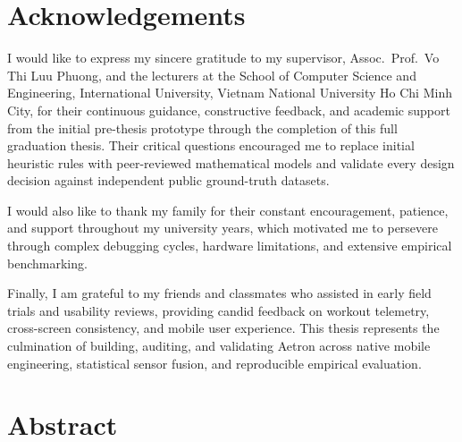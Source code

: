 \documentclass[12pt,a4paper,oneside]{report}
\begin{document}
\chapter*{Acknowledgements}
\thispagestyle{plain}

I would like to express my sincere gratitude to my supervisor, Assoc.\ Prof.\ Vo Thi Luu Phuong, and the lecturers at the School of Computer Science and Engineering, International University, Vietnam National University Ho Chi Minh City, for their continuous guidance, constructive feedback, and academic support from the initial pre-thesis prototype through the completion of this full graduation thesis. Their critical questions encouraged me to replace initial heuristic rules with peer-reviewed mathematical models and validate every design decision against independent public ground-truth datasets.

I would also like to thank my family for their constant encouragement, patience, and support throughout my university years, which motivated me to persevere through complex debugging cycles, hardware limitations, and extensive empirical benchmarking.

Finally, I am grateful to my friends and classmates who assisted in early field trials and usability reviews, providing candid feedback on workout telemetry, cross-screen consistency, and mobile user experience. This thesis represents the culmination of building, auditing, and validating Aetron across native mobile engineering, statistical sensor fusion, and reproducible empirical evaluation.

\clearpage

\tableofcontents
\clearpage

\listoffigures
\clearpage

\listoftables
\clearpage

\chapter*{Abstract}
\thispagestyle{plain}
\end{document}
